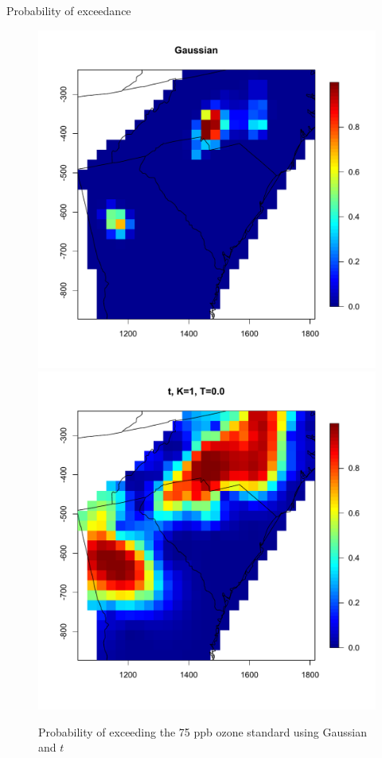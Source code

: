 \documentclass{beamer}
\begin{document}
\begin{frame}{Probability of exceedance}
\centering
\begin{figure}
    \includegraphics[width=.5\linewidth]{./plots/p-exceed-std-gau.pdf}
    \includegraphics[width=.5\linewidth]{./plots/p-exceed-std-t10.pdf}
    \caption{Probability of exceeding the 75 ppb ozone standard using Gaussian and $t$}
\end{figure}
\end{frame}
\end{document}
